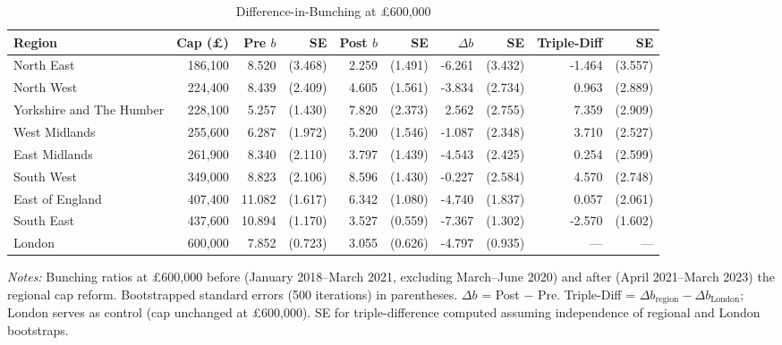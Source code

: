 \begin{table}[htbp]
\centering
\caption{Difference-in-Bunching at \pounds600,000}
\label{tab:dib}
\begin{adjustbox}{max width=\textwidth}
\begin{tabular}{lrrrrrrrrr}
\hline\hline
Region & Cap (\pounds) & Pre $b$ & SE & Post $b$ & SE & $\Delta b$ & SE & Triple-Diff & SE \\
\hline
North East & 186,100 & 8.520 & (3.468) & 2.259 & (1.491) & -6.261 & (3.432) & -1.464 & (3.557) \\
North West & 224,400 & 8.439 & (2.409) & 4.605 & (1.561) & -3.834 & (2.734) & 0.963 & (2.889) \\
Yorkshire and The Humber & 228,100 & 5.257 & (1.430) & 7.820 & (2.373) & 2.562 & (2.755) & 7.359 & (2.909) \\
West Midlands & 255,600 & 6.287 & (1.972) & 5.200 & (1.546) & -1.087 & (2.348) & 3.710 & (2.527) \\
East Midlands & 261,900 & 8.340 & (2.110) & 3.797 & (1.439) & -4.543 & (2.425) & 0.254 & (2.599) \\
South West & 349,000 & 8.823 & (2.106) & 8.596 & (1.430) & -0.227 & (2.584) & 4.570 & (2.748) \\
East of England & 407,400 & 11.082 & (1.617) & 6.342 & (1.080) & -4.740 & (1.837) & 0.057 & (2.061) \\
South East & 437,600 & 10.894 & (1.170) & 3.527 & (0.559) & -7.367 & (1.302) & -2.570 & (1.602) \\
London & 600,000 & 7.852 & (0.723) & 3.055 & (0.626) & -4.797 & (0.935) & --- & --- \\
\hline\hline
\end{tabular}
\end{adjustbox}
\begin{minipage}{0.95\textwidth}
\footnotesize \textit{Notes:} Bunching ratios at \pounds600,000 before (January 2018--March 2021, excluding March--June 2020) and after (April 2021--March 2023) the regional cap reform. Bootstrapped standard errors (500 iterations) in parentheses. $\Delta b$ = Post $-$ Pre. Triple-Diff = $\Delta b_{\text{region}} - \Delta b_{\text{London}}$; London serves as control (cap unchanged at \pounds600,000). SE for triple-difference computed assuming independence of regional and London bootstraps.
\end{minipage}
\end{table}
